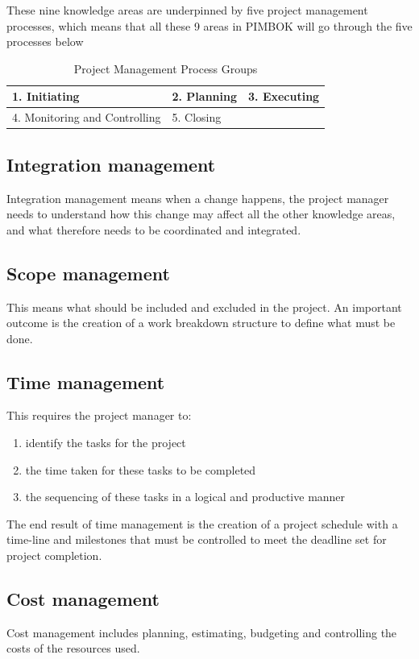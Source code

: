 \documentclass[math,code]{amznotes}
\theoremstyle{remark}
\begin{document}
These nine knowledge areas are underpinned by five project management processes, which means that all these 9 areas in PIMBOK will go through the five processes below

\begin{table}[h]
    \centering
    \renewcommand{\arraystretch}{1.2}
    \begin{tabular}{|m{4.5cm}|m{4.5cm}|m{4.5cm}|}
        \hline
        1. Initiating & 2. Planning & 3. Executing \\
        \hline
        4. Monitoring and Controlling & 5. Closing & \\ 
        \hline
    \end{tabular}
    \caption{Project Management Process Groups}
    \label{tab:chapter1-pm-process-groups}
\end{table}

\subsection{Integration management}
Integration management means when a change happens, the project manager needs to understand how this change may affect all the other knowledge areas, and what therefore needs to be coordinated and integrated.

\subsection{Scope management}
This means what should be included and excluded in the project. An important outcome is the creation of a work breakdown structure to define what must be done.

\subsection{Time management}
This requires the project manager to:
\begin{enumerate}
    \item identify the tasks for the project
    \item the time taken for these tasks to be completed
    \item the sequencing of these tasks in a logical and productive manner
\end{enumerate}
The end result of time management is the creation of a project schedule with a time-line and milestones that must be controlled to meet the deadline set for project completion.

\subsection{Cost management}
Cost management includes planning, estimating, budgeting and controlling the costs of the resources used.
\end{document}
